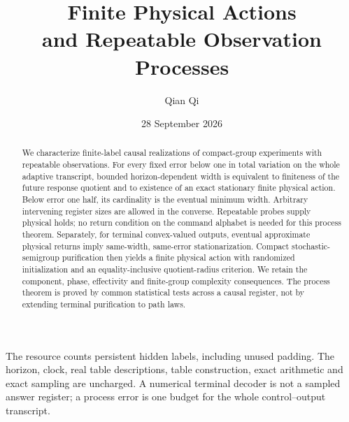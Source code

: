 \documentclass[11pt]{amsart}
\title[Finite actions and observation processes]{Finite Physical Actions\\and Repeatable Observation Processes}
\author{Qian Qi}
\date{28 September 2026}
\numberwithin{equation}{section}
\theoremstyle{definition}\newtheorem{definition}[theorem]{Definition}
\theoremstyle{remark}\newtheorem{remark}[theorem]{Remark}
\begin{document}
\begin{abstract}
We characterize finite-label causal realizations of compact-group
experiments with repeatable observations. For every fixed error below
one in total variation on the whole adaptive transcript, bounded
horizon-dependent width is equivalent to finiteness of the future
response quotient and to existence of an exact stationary finite
physical action. Below error one half, its cardinality is the eventual
minimum width. Arbitrary intervening register sizes are allowed in the
converse. Repeatable probes supply physical holds; no return condition
on the command alphabet is needed for this process theorem. Separately,
for terminal convex-valued outputs, eventual approximate physical
returns imply same-width, same-error stationarization. Compact
stochastic-semigroup purification then yields a finite physical action
with randomized initialization and an equality-inclusive quotient-radius
criterion. We retain the component, phase, effectivity and finite-group
complexity consequences. The process theorem is proved by common
statistical tests across a causal register, not by extending terminal
purification to path laws.
\end{abstract}
\maketitle
\noindent The resource counts persistent hidden labels, including unused
padding. The horizon, clock, real table descriptions, table construction,
exact arithmetic and exact sampling are uncharged. A numerical terminal
decoder is not a sampled answer register; a process error is one budget
for the whole control--output transcript.















\end{document}
